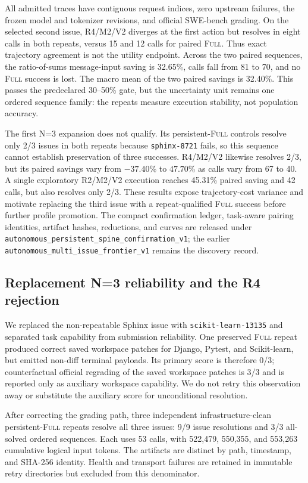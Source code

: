 \documentclass[11pt]{article}
\begin{document}
All admitted traces have contiguous request indices, zero upstream failures,
the frozen model and tokenizer revisions, and official SWE-bench grading.  On
the selected second issue, R4/M2/V2 diverges at the first action but resolves
in eight calls in both repeats, versus 15 and 12 calls for paired
\textsc{Full}.  Thus exact trajectory agreement is not the utility endpoint.
Across the two paired sequences, the ratio-of-sums message-input saving is
32.65\%, calls fall from 81 to 70, and no \textsc{Full} success is lost.  The
macro mean of the two paired savings is 32.40\%.  This passes the predeclared
30--50\% gate, but the uncertainty unit remains one ordered sequence family:
the repeats measure execution stability, not population accuracy.

The first N=3 expansion does not qualify.  Its persistent-\textsc{Full}
controls resolve only 2/3 issues in both repeats because
\texttt{sphinx-8721} fails, so this sequence cannot establish preservation of
three successes.  R4/M2/V2 likewise resolves 2/3, but its paired savings vary
from $-37.40$\% to $47.70$\% as calls vary from 67 to 40.  A single exploratory
R2/M2/V2 execution reaches 45.31\% paired saving and 42 calls, but also resolves
only 2/3.  These results expose trajectory-cost variance and motivate replacing
the third issue with a repeat-qualified \textsc{Full} success before further
profile promotion.  The compact confirmation ledger, task-aware pairing
identities, artifact hashes, reductions, and curves are released under
\texttt{autonomous\_persistent\_spine\_confirmation\_v1}; the earlier
\texttt{autonomous\_multi\_issue\_frontier\_v1} remains the discovery record.

\subsection{Replacement N=3 reliability and the R4 rejection}

We replaced the non-repeatable Sphinx issue with
\texttt{scikit-learn-13135} and separated task capability from submission
reliability.  One preserved \textsc{Full} repeat produced correct saved
workspace patches for Django, Pytest, and Scikit-learn, but emitted non-diff
terminal payloads.  Its primary score is therefore 0/3; counterfactual
official regrading of the saved workspace patches is 3/3 and is reported only
as auxiliary workspace capability.  We do not retry this observation away or
substitute the auxiliary score for unconditional resolution.

After correcting the grading path, three independent infrastructure-clean
persistent-\textsc{Full} repeats resolve all three issues: 9/9 issue
resolutions and 3/3 all-solved ordered sequences.  Each uses 53 calls, with
522,479, 550,355, and 553,263 cumulative logical input tokens.  The artifacts
are distinct by path, timestamp, and SHA-256 identity.  Health and transport
failures are retained in immutable retry directories but excluded from this
denominator.
\end{document}
